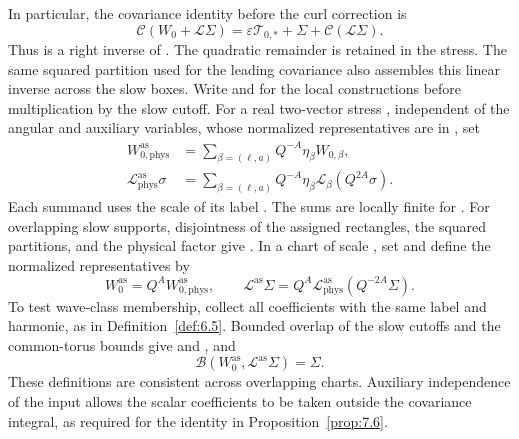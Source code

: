 %
In particular, the covariance identity before the curl correction is
\[
  \mathcal C(W_0+\mathcal L\Sigma)=\varepsilon \mathcal T_{0,*}+\Sigma+\mathcal C(\mathcal L\Sigma).
\]
Thus  is a right inverse of
. The quadratic remainder
 is retained in the stress.
The same squared partition used for the leading covariance also assembles this linear inverse
across the slow boxes. Write  and
 for the local constructions before multiplication
by the slow cutoff. For a real two-vector stress , independent of the angular and
auxiliary variables, whose normalized representatives  are in
, set
\begin{equation}
\begin{aligned}
  W_{0,\mathrm{phys}}^{\mathrm{as}}
    &=\sum_{\beta=(\ell,a)} Q^{-A}\eta_\beta W_{0,\beta},\\
  \mathcal L_{\mathrm{phys}}^{\mathrm{as}}\sigma
    &=\sum_{\beta=(\ell,a)} Q^{-A}\eta_\beta\mathcal L_\beta(Q^{2A}\sigma).
\end{aligned}
\tag{7.35}\label{eq:7.35}
\end{equation}
Each summand uses the scale  of its label
. The sums are locally finite for
. For overlapping slow supports, disjointness of the assigned rectangles, the squared
partitions, and the physical factor  give
. In a chart of scale
, set  and define the normalized representatives by
\[
  W_0^{\mathrm{as}}=Q^A W_{0,\mathrm{phys}}^{\mathrm{as}},
  \qquad
  \mathcal L^{\mathrm{as}}\Sigma
  =Q^A\mathcal L_{\mathrm{phys}}^{\mathrm{as}}(Q^{-2A}\Sigma).
\]
To test wave-class membership, collect all coefficients with the same label and harmonic, as
in Definition~\ref{def:6.5}. Bounded overlap of the slow cutoffs and the common-torus bounds give
 and
, and
\begin{equation}
  \mathcal B(W_0^{\mathrm{as}},\mathcal L^{\mathrm{as}}\Sigma)=\Sigma.
\tag{7.36}\label{eq:7.36}
\end{equation}
These definitions are consistent across overlapping charts. Auxiliary independence of the
input allows the scalar coefficients to be taken outside the covariance integral, as required
for the identity in Proposition~\ref{prop:7.6}.

